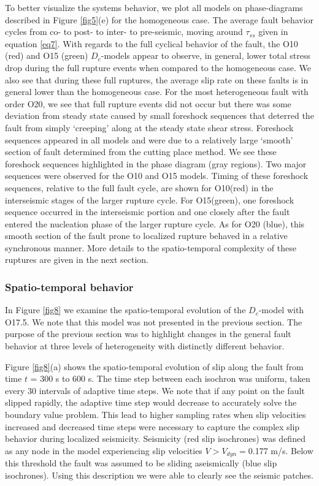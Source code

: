 \documentclass[draft]{agujournal2019}
\begin{document}
To better visualize the systems behavior, we plot all models on phase-diagrams described in Figure \ref{fig5}(e) for the homogeneous case. The average fault behavior cycles from co- to post- to inter- to pre-seismic, moving around $\tau_{ss}$ given in equation \eqref{eq7}. With regards to the full cyclical behavior of the fault, the O10 (red) and O15 (green) $D_{c}$-models appear to observe, in general, lower total stress drop during the full rupture events when compared to the homogeneous case.  We also see that during these full ruptures, the average slip rate on these faults is in general lower than the homogeneous case.  For the most heterogeneous fault with order O20, we see that full rupture events did not occur but there was some deviation from steady state caused by small foreshock sequences that deterred the fault from simply `creeping' along at the steady state shear stress. Foreshock sequences appeared in all models and were due to a relatively large `smooth' section of fault determined from the cutting place method. We see these foreshock sequences highlighted in the phase diagram (gray regions). Two major sequences were observed for the O10 and O15 models. Timing of these foreshock sequences, relative to the full fault cycle, are shown for O10(red) in the interseismic stages of the larger rupture cycle. For O15(green), one foreshock sequence occurred in the interseismic portion and one closely after the fault entered the nucleation phase of the larger rupture cycle. As for O20 (blue), this smooth section of the fault prone to localized rupture behaved in a relative synchronous manner. More details to the spatio-temporal complexity of these ruptures are given in the next section. 

\subsubsection{Spatio-temporal behavior}
\label{spatialmodel}

In Figure \ref{fig8} we examine the spatio-temporal evolution of the $D_{c}$-model with O17.5. We note that this model was not presented in the previous section. The purpose of the previous section was to highlight changes in the general fault behavior at three levels of heterogeneity  with distinctly different behavior.

Figure \ref{fig8}(a) shows the spatio-temporal evolution of slip along the fault from time $t$ = 300 s to 600 s. The time step between each isochron was uniform, taken every 30 intervals of adaptive time steps.  We note that if any point on the fault slipped rapidly, the adaptive time step would decrease to accurately solve the boundary value problem. This lead to higher sampling rates when slip velocities increased and decreased time steps were necessary to capture the complex slip behavior during localized seismicity.  Seismicity (red slip isochrones) was defined as any node in the model experiencing slip velocities $V > V_{dyn}=$0.177 m/s. Below this threshold the fault was assumed to be sliding aseismically (blue slip isochrones). Using this description we were able to clearly see the seismic patches.
\end{document}
